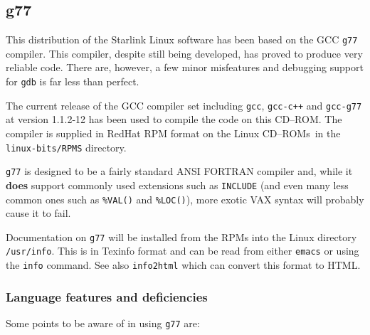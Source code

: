\documentclass[twoside,11pt]{article}
\newcommand{\xlabel}[1]{}
\renewcommand{\_}{\texttt{\symbol{95}}}
\newcommand{\cdrom}{CD--ROM}
\newcommand{\cdrom}{CD-ROM}
\newcommand{\cdroms}{CD--ROMs}
\newcommand{\cdroms}{CD-ROMs}
\begin{document}
\subsection{\xlabel{g77}g77}
\label{g77}

This distribution of the Starlink Linux software has been based on the GCC
\texttt{g77} compiler.  This compiler, despite still being developed,
has proved to produce very reliable code.  There are, however, a few
minor misfeatures and debugging support for \texttt{gdb} is far less
than perfect.

The current release of the GCC compiler set including \texttt{gcc},
\texttt{gcc-c++} and \texttt{gcc-g77} at version 1.1.2-12 has been
used to compile the code on this \cdrom.  The compiler is supplied in
RedHat RPM format on the Linux \cdroms\ in the \texttt{linux-bits/RPMS}
directory.

\texttt{g77} is designed to be a fairly standard ANSI FORTRAN compiler
and, while it \textbf{does} support commonly used extensions such as
\texttt{INCLUDE} (and even many less common ones such as \texttt{\%VAL()}
and \texttt{\%LOC()}), more exotic VAX syntax will probably cause it to fail.

Documentation on \texttt{g77} will be installed from the RPMs into the
Linux directory \texttt{/usr/info}.  This is in Texinfo format and can
be read from either \texttt{emacs} or using the \texttt{info} command.
See also \texttt{info2html} which can convert this format to HTML.

\subsubsection{Language features and deficiencies}

Some points to be aware of in using \texttt{g77} are:
\end{document}
